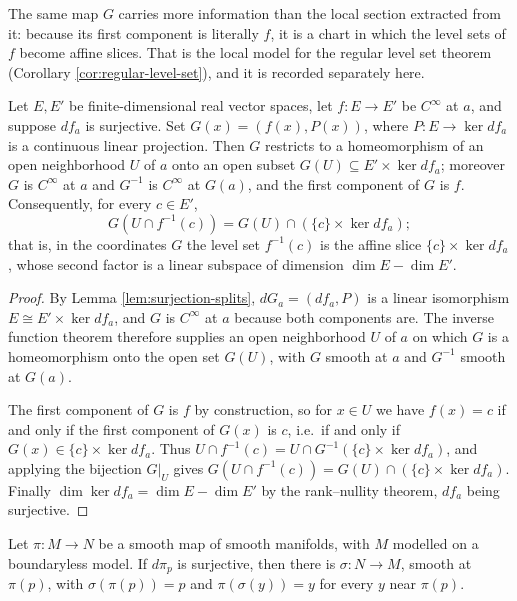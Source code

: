 The same map $G$ carries more information than the local section extracted from it: because its first component is literally $f$, it is a chart in which the level sets of $f$ become affine slices. That is the local model for the regular level set theorem (Corollary \ref{cor:regular-level-set}), and it is recorded separately here.

\begin{proposition}
\label{prop:slice-chart-euclidean}
\leanok
{}
Let $E, E'$ be finite-dimensional real vector spaces, let $f : E \to E'$ be $C^\infty$ at $a$, and suppose $df_a$ is surjective. Set $G(x) = (f(x), P(x))$, where $P : E \to \ker df_a$ is a continuous linear projection. Then $G$ restricts to a homeomorphism of an open neighborhood $U$ of $a$ onto an open subset $G(U) \subseteq E' \times \ker df_a$; moreover $G$ is $C^\infty$ at $a$ and $G^{-1}$ is $C^\infty$ at $G(a)$, and the first component of $G$ is $f$. Consequently, for every $c \in E'$,
\[
G(U \cap f^{-1}(c)) = G(U) \cap \left(\{c\} \times \ker df_a\right);
\]
that is, in the coordinates $G$ the level set $f^{-1}(c)$ is the affine slice $\{c\} \times \ker df_a$, whose second factor is a linear subspace of dimension $\dim E - \dim E'$.
\end{proposition}

\begin{proof}
\leanok
{}
By Lemma \ref{lem:surjection-splits}, $dG_a = (df_a, P)$ is a linear isomorphism $E \cong E' \times \ker df_a$, and $G$ is $C^\infty$ at $a$ because both components are. The inverse function theorem therefore supplies an open neighborhood $U$ of $a$ on which $G$ is a homeomorphism onto the open set $G(U)$, with $G$ smooth at $a$ and $G^{-1}$ smooth at $G(a)$.

The first component of $G$ is $f$ by construction, so for $x \in U$ we have $f(x) = c$ if and only if the first component of $G(x)$ is $c$, i.e.\ if and only if $G(x) \in \{c\} \times \ker df_a$. Thus $U \cap f^{-1}(c) = U \cap G^{-1}(\{c\} \times \ker df_a)$, and applying the bijection $G|_U$ gives $G(U \cap f^{-1}(c)) = G(U) \cap (\{c\} \times \ker df_a)$. Finally $\dim \ker df_a = \dim E - \dim E'$ by the rank–nullity theorem, $df_a$ being surjective.
\end{proof}

\begin{proposition}
\label{prop:local-section-manifold}
\leanok
{}
Let $\pi : M \to N$ be a smooth map of smooth manifolds, with $M$ modelled on a boundaryless model. If $d\pi_p$ is surjective, then there is $\sigma : N \to M$, smooth at $\pi(p)$, with $\sigma(\pi(p)) = p$ and $\pi(\sigma(y)) = y$ for every $y$ near $\pi(p)$.
\end{proposition}

